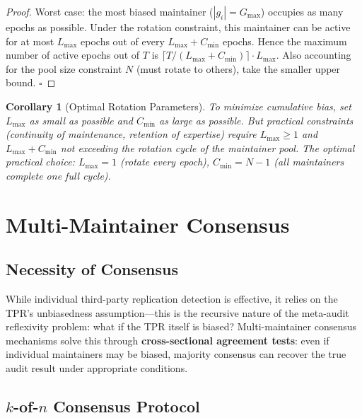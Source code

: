\documentclass[11pt,a4paper]{article}
\newtheorem{corollary}[theorem]{Corollary}
\theoremstyle{definition}
\begin{document}
\begin{proof}
Worst case: the most biased maintainer ($|g_i| = G_{\max}$) occupies as many epochs as possible. Under the rotation constraint, this maintainer can be active for at most $L_{\max}$ epochs out of every $L_{\max} + C_{\min}$ epochs. Hence the maximum number of active epochs out of $T$ is $\lceil T/(L_{\max} + C_{\min})\rceil \cdot L_{\max}$. Also accounting for the pool size constraint $N$ (must rotate to others), take the smaller upper bound. \hfill$\square$
\end{proof}

\begin{corollary}[Optimal Rotation Parameters]
\label{cor:optimal_rotation}
To minimize cumulative bias, set $L_{\max}$ as small as possible and $C_{\min}$ as large as possible. But practical constraints (continuity of maintenance, retention of expertise) require $L_{\max} \geq 1$ and $L_{\max} + C_{\min}$ not exceeding the rotation cycle of the maintainer pool. The optimal practical choice: $L_{\max} = 1$ (rotate every epoch), $C_{\min} = N-1$ (all maintainers complete one full cycle).
\end{corollary}

\section{Multi-Maintainer Consensus}

\subsection{Necessity of Consensus}

\noindent
While individual third-party replication detection is effective, it relies on the TPR's unbiasedness assumption---this is the recursive nature of the meta-audit reflexivity problem: what if the TPR itself is biased? Multi-maintainer consensus mechanisms solve this through \textbf{cross-sectional agreement tests}: even if individual maintainers may be biased, majority consensus can recover the true audit result under appropriate conditions.

\subsection{$k$-of-$n$ Consensus Protocol}
\end{document}
